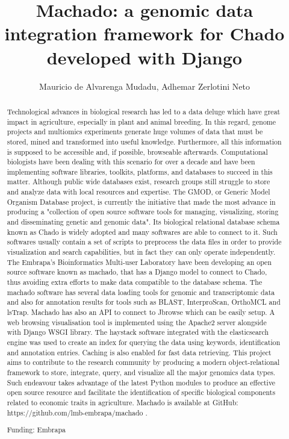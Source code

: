 \documentclass[twoside]{article}
\title{\vspace{-15mm}\fontsize{24pt}{10pt}\selectfont\textbf{ Machado: a genomic data integration framework for Chado developed with Django }} %
\author{ Mauricio de Alvarenga Mudadu, Adhemar Zerlotini Neto }
\affil{ Embrapa Inform\'atica Agropecu\'aria }
\date{}
\begin{document}
  
  
  \maketitle %
  
  
  \thispagestyle{fancy} %
  
  
  \begin{abstract}
  Technological advances in biological research has led to a data deluge which have great impact in agriculture,  especially in plant and animal breeding. In this regard,  genome projects and multiomics experiments generate huge volumes of data that must be stored,  mined and transformed into useful knowledge. Furthermore,  all this information is supposed to be accessible and,  if possible,  browseable afterwards. Computational biologists have been dealing with this scenario for over a decade and have been implementing software libraries,  toolkits,  platforms,  and databases to succeed in this matter.
Although public wide databases exist,  research groups still struggle to store and analyze data with local resources and expertise. The GMOD,  or Generic Model Organism Database project,  is currently the initiative that made the most advance in producing a "collection of open source software tools for managing,  visualizing,  storing and disseminating genetic and genomic data". Its biological relational database schema known as Chado is widely adopted and many softwares are able to connect to it. Such softwares usually contain a set of scripts to preprocess the data files in order to provide visualization and search capabilities,  but in fact they can only operate independently. 
The Embrapa’s Bioinformatics Multi-user Laboratory have been developing an open source software known as machado,  that has a Django model to connect to Chado,  thus avoiding extra efforts to make data compatible to the database schema. The machado software has several data loading tools for genomic and transcriptomic data and also for annotation results for tools such as BLAST,  InterproScan,  OrthoMCL and lsTrap. Machado has also an API to connect to Jbrowse which can be easily setup. A web browsing visualisation tool is implemented using the Apache2 server alongside with Django WSGI library. The haystack software integrated with the elasticsearch engine was used to create an index for querying the data using keywords,  identification and annotation entries. Caching is also enabled for fast data retrieving.
This project aims to contribute to the research community by producing a modern object-relational framework to store,  integrate,  query,  and visualize all the major genomics data types. Such endeavour takes advantage of the latest Python modules to produce an effective open source resource and facilitate the identification of specific biological components related to economic traits in agriculture. Machado is available at GitHub: https://github.com/lmb-embrapa/machado .
  
  Funding: Embrapa \\ 
  \end{abstract}
  
\end{document}

